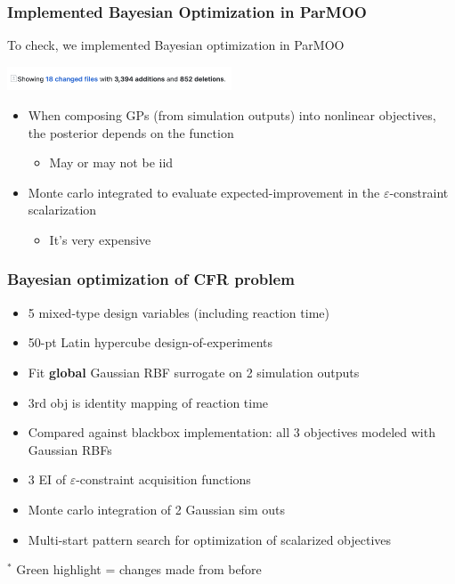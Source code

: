 \documentclass[aspectratio=169]{beamer}
\begin{document}
\begin{frame}\frametitle{Implemented Bayesian Optimization in ParMOO}

To check, we implemented Bayesian optimization in ParMOO

\bigskip
\begin{center}
\includegraphics[width=0.5\textwidth]{../img/moo_new/bo-pr.png}
\end{center}

\begin{itemize}
\item When composing GPs (from simulation outputs) into nonlinear objectives, the posterior depends on the function
\begin{itemize}
\item May or may not be iid
\end{itemize}
\item Monte carlo integrated to evaluate expected-improvement in the $\varepsilon$-constraint scalarization
\begin{itemize}
\item It's very expensive
\end{itemize}
\end{itemize}
\end{frame}

\begin{frame}\frametitle{Bayesian optimization of CFR problem}
\begin{itemize}
\item 5 mixed-type design variables (including reaction time)
\item 50-pt Latin hypercube design-of-experiments
\item Fit {\bf global} Gaussian RBF surrogate on 2 simulation outputs
\item {\color{blue}3rd obj is identity mapping of reaction time}
\item {\color{red}Compared against blackbox implementation: all 3 objectives
modeled with Gaussian RBFs}
\item {\color{green}3 EI of $\varepsilon$-constraint acquisition functions}
\item {\color{green}Monte carlo integration of 2 Gaussian sim outs}
\item {\color{green}Multi-start pattern search for optimization of scalarized objectives}
\end{itemize}

\bigskip

$^*${\color{green} Green highlight} = changes made from before
\end{frame}
\end{document}
